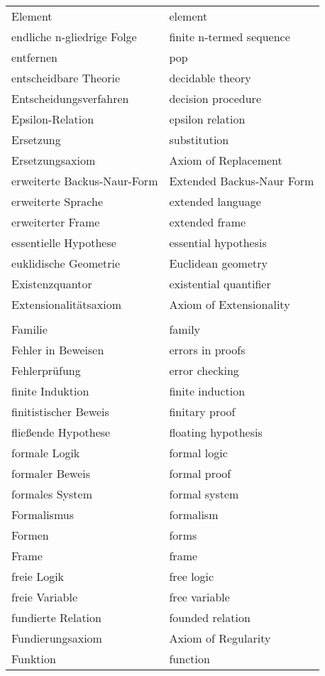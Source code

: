 \begin{longtabu}   { @{} X[l] X[l] }
    Element & element \\
    endliche n-gliedrige Folge & finite n-termed sequence \\
    entfernen & pop \\
    entscheidbare Theorie & decidable theory \\
    Entscheidungsverfahren & decision procedure \\
    Epsilon-Relation & epsilon relation \\
    Ersetzung & substitution \\
    Ersetzungsaxiom & Axiom of Replacement \\
    erweiterte Backus-Naur-Form & Extended Backus-Naur Form \\
    erweiterte Sprache & extended language \\
    erweiterter Frame & extended frame \\
    essentielle Hypothese & essential hypothesis \\
    euklidische Geometrie & Euclidean geometry \\
    Existenzquantor & existential quantifier \\
    Extensionalitätsaxiom & Axiom of Extensionality \\
     & \\
    Familie & family \\
    Fehler in Beweisen & errors in proofs \\
    Fehlerprüfung & error checking \\
    finite Induktion & finite induction \\
    finitistischer Beweis & finitary proof \\
    fließende Hypothese & floating hypothesis \\
    formale Logik & formal logic \\
    formaler Beweis & formal proof \\
    formales System & formal system \\
    Formalismus & formalism \\
    Formen & forms \\
    Frame & frame \\
    freie Logik & free logic \\
    freie Variable & free variable \\
    fundierte Relation & founded relation \\
    Fundierungsaxiom & Axiom of Regularity \\
    Funktion & function \\

\end{longtabu}
